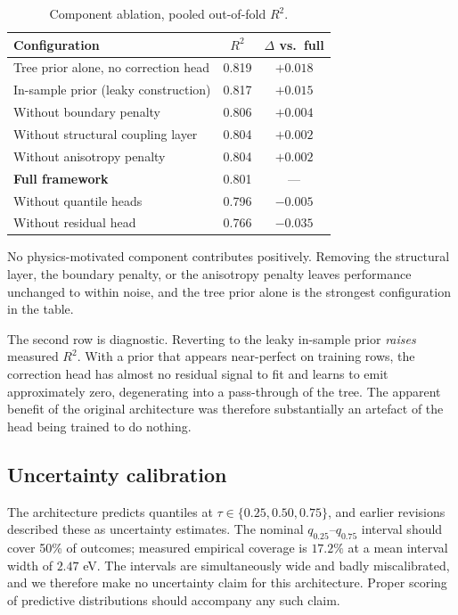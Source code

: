 \documentclass[journal]{IEEEtran}
\begin{document}
\begin{table}[t]
\centering
\caption{Component ablation, pooled out-of-fold $R^2$.}
\label{tab:ablation}
\begin{tabular}{lcc}
\toprule
Configuration & $R^2$ & $\Delta$ vs.\ full \\
\midrule
Tree prior alone, no correction head & 0.819 & $+0.018$ \\
In-sample prior (leaky construction) & 0.817 & $+0.015$ \\
Without boundary penalty             & 0.806 & $+0.004$ \\
Without structural coupling layer    & 0.804 & $+0.002$ \\
Without anisotropy penalty           & 0.804 & $+0.002$ \\
\textbf{Full framework}              & 0.801 & --- \\
Without quantile heads               & 0.796 & $-0.005$ \\
Without residual head                & 0.766 & $-0.035$ \\
\bottomrule
\end{tabular}
\end{table}

No physics-motivated component contributes positively. Removing the structural
layer, the boundary penalty, or the anisotropy penalty leaves performance
unchanged to within noise, and the tree prior alone is the strongest
configuration in the table.

The second row is diagnostic. Reverting to the leaky in-sample prior
\emph{raises} measured $R^2$. With a prior that appears near-perfect on training
rows, the correction head has almost no residual signal to fit and learns to
emit approximately zero, degenerating into a pass-through of the tree. The
apparent benefit of the original architecture was therefore substantially an
artefact of the head being trained to do nothing.

\subsection{Uncertainty calibration}
The architecture predicts quantiles at $\tau \in \{0.25, 0.50, 0.75\}$, and
earlier revisions described these as uncertainty estimates. The nominal
$q_{0.25}$--$q_{0.75}$ interval should cover 50\% of outcomes; measured
empirical coverage is $17.2\%$ at a mean interval width of $2.47$ eV. The
intervals are simultaneously wide and badly miscalibrated, and we therefore make
no uncertainty claim for this architecture. Proper scoring of predictive
distributions \cite{gneiting2007probabilistic} should accompany any such claim.
\end{document}
